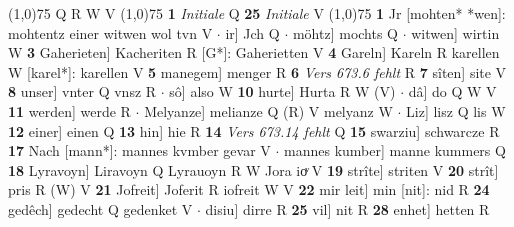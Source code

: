 \documentclass[8pt,a4paper,notitlepage]{article}
\begin{document}
\begin{table}[ht]
\begin{minipage}[t]{0.5\linewidth}
\begin{tabular}{rl}
\end{tabular}
\scriptsize
\line(1,0){75} \newline
Q R W V \newline
\line(1,0){75} \newline
\textbf{1} \textit{Initiale} Q  \textbf{25} \textit{Initiale} V  \newline
\line(1,0){75} \newline
\textbf{1} Jr [mohten* *wen]: mohtentz einer witwen wol tvn V  $\cdot$ ir] Jch Q  $\cdot$ möhtz] mochts Q  $\cdot$ witwen] wirtin W \textbf{3} Gaherieten] Kacheriten R [G*]: Gaherietten V \textbf{4} Gareln] Kareln R karellen W [karel*]: karellen V \textbf{5} manegem] menger R \textbf{6} \textit{Vers 673.6 fehlt} R  \textbf{7} sîten] site V \textbf{8} unser] vnter Q vnsz R  $\cdot$ sô] also W \textbf{10} hurte] Hurta R W (V)  $\cdot$ dâ] do Q W V \textbf{11} werden] werde R  $\cdot$ Melyanze] melianze Q (R) V melyanz W  $\cdot$ Liz] lisz Q lis W \textbf{12} einer] einen Q \textbf{13} hin] hie R \textbf{14} \textit{Vers 673.14 fehlt} Q  \textbf{15} swarziu] schwarcze R \textbf{17} Nach [mann*]: mannes kvmber gevar V  $\cdot$ mannes kumber] manne kummers Q \textbf{18} Lyravoyn] Liravoyn Q Lyrauoyn R W Jora ioͮ V \textbf{19} strîte] striten V \textbf{20} strît] pris R (W) V \textbf{21} Jofreit] Joferit R iofreit W V \textbf{22} mir leit] min [nit]: nid R \textbf{24} gedêch] gedecht Q gedenket V  $\cdot$ disiu] dirre R \textbf{25} vil] nit R \textbf{28} enhet] hetten R \newline
\end{minipage}
\end{table}
\end{document}
